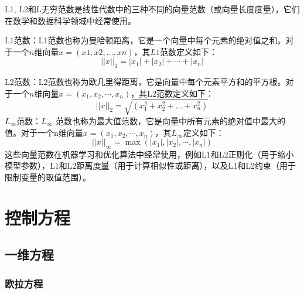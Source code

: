 \documentclass{article}
\numberwithin{equation}{subsection}    %
\begin{document}
\begin{appendix}
    L1, L2和L无穷范数是线性代数中的三种不同的向量范数（或向量长度度量），它们在数学和数据科学领域中经常使用。

    L1范数：L1范数也称为曼哈顿距离，它是一个向量中每个元素的绝对值之和。对于一个$n$维向量$x = (x1, x2, ..., xn)$，其$L1$范数定义如下：
    \begin{equation}
        ||x||_1 = |x_1| + |x_2| + \cdots + |x_n|
    \end{equation}

    L2范数：L2范数也称为欧几里得距离，它是向量中每个元素平方和的平方根。对于一个$n$维向量$x = (x_1, x_2,\cdots, x_n)$，其L2范数定义如下：
    \begin{equation}
        ||x||_2 = \sqrt{(x_1^2 + x_2^2 + ... + x_n^2)}
    \end{equation}
    $L_\infty$范数：$L_\infty$ 范数也称为最大值范数，它是向量中所有元素的绝对值中最大的值。对于一个n维向量$x = (x_1, x_2,\cdots, x_n)$，其$L_\infty$定义如下：
    \begin{equation}
        ||x||_\infty = \max(|x_1|, |x_2|,\cdots, |x_n|)
    \end{equation}
    这些向量范数在机器学习和优化算法中经常使用，例如L1和L2正则化（用于缩小模型参数），L1和L2距离度量（用于计算相似性或距离），以及L1和L2约束（用于限制变量的取值范围）。
    \newpage
    \section{控制方程}
    \subsection{一维方程}
    \subsubsection{欧拉方程}

\end{appendix}
\end{document}
